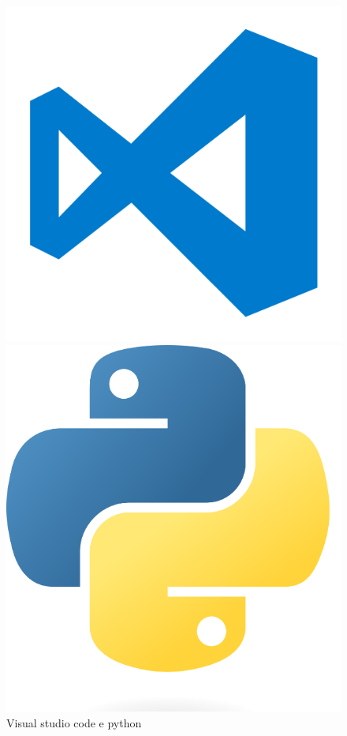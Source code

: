 \begin{figure}[h]
    \begin{center}
        \begin{minipage}[b]{0.35\linewidth}
            \centering
            \includegraphics[width=\linewidth]{images/image2.png}
        \end{minipage}
        \begin{minipage}[b]{0.35\linewidth}
            \centering
            \includegraphics[width=\linewidth]{images/image3.png}
        \end{minipage}
    \end{center}
    \caption{Visual studio code e python}
\end{figure}

